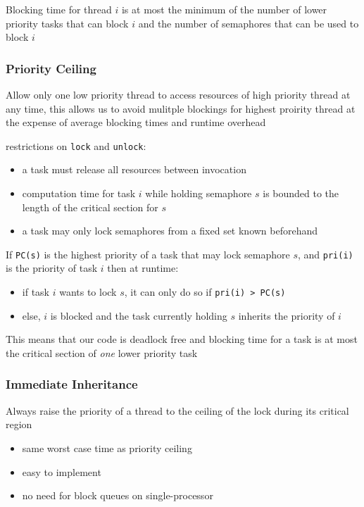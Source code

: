 \documentclass[]{article}
\theoremstyle{definition}
\begin{document}
	Blocking time for thread $i$ is at most the minimum of the number of lower priority tasks that can block $i$ and the number of semaphores that can be used to block $i$

	\subsubsection{Priority Ceiling} 
	Allow only one low priority thread to access resources of high priority thread at any time, this allows us to avoid mulitple blockings for highest proirity thread at the expense of average blocking times and runtime overhead

	restrictions on \lstinline|lock| and \lstinline|unlock|:
	\begin{itemize}
		\item a task must release all resources between invocation
		\item computation time for task $i$ while holding semaphore $s$ is bounded to the length of the critical section for $s$
		\item a task may only lock semaphores from a fixed set known beforehand
	\end{itemize}

	If \lstinline|PC(s)| is the highest priority of a task that may lock semaphore $s$, and \lstinline|pri(i)| is the priority of task $i$ then at runtime:
	\begin{itemize}
		\item if task $i$ wants to lock $s$, it can only do so if \lstinline|pri(i) > PC(s)|
		\item else, $i$ is blocked and the task currently holding $s$ inherits the priority of $i$
	\end{itemize}


	This means that our code is deadlock free and blocking time for a task is at most the critical section of \textit{one} lower priority task

	\subsubsection{Immediate Inheritance} 
	Always raise the priority of a thread to the ceiling of the lock during its critical region

	\begin{itemize}
		\item same worst case time as priority ceiling
		\item easy to implement
		\item no need for block queues on single-processor
	\end{itemize}
	
\end{document}

